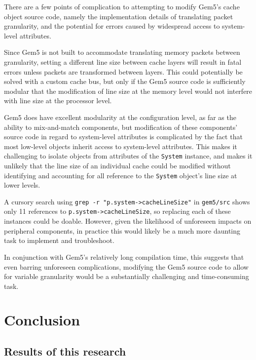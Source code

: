 \documentclass[12pt,twoside]{reedthesis}
\begin{document}
	There are a few points of complication to attempting to modify Gem5's cache object source code, namely the implementation details of translating packet granularity, and the potential for errors caused by widespread access to system-level attributes.
	
	Since Gem5 is not built to accommodate translating memory packets between granularity, setting a different line size between cache layers will result in fatal errors unless packets are transformed between layers. This could potentially be solved with a custom cache bus, but only if the Gem5 source code is sufficiently modular that the modification of line size at the memory level would not interfere with line size at the processor level.
	
	Gem5 does have excellent modularity at the configuration level, as far as the ability to mix-and-match components, but modification of these components' source code in regard to system-level attributes is complicated by the fact that most low-level objects inherit access to system-level attributes. This makes it challenging to isolate objects from attributes of the \verb`System` instance, and makes it unlikely that the line size of an individual cache could be modified without identifying and accounting for all reference to the \verb`System` object's line size at lower levels.

	A cursory search using \verb`grep -r "p.system->cacheLineSize"` in \verb`gem5/src` shows only 11 references to \verb`p.system->cacheLineSize`, so replacing each of these instances could be doable. However, given the likelihood of unforeseen impacts on peripheral components, in practice this would likely be a much more daunting task to implement and troubleshoot.
	
	In conjunction with Gem5's relatively long compilation time, this suggests that even barring unforeseen complications, modifying the Gem5 source code to allow for variable granularity would be a substantially challenging and time-consuming task.

\chapter{Conclusion}

\section{Results of this research}
\end{document}
